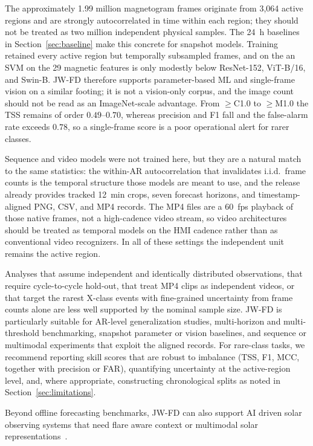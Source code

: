 \documentclass[universe,article,submit,moreauthors]{Definitions/mdpi}
\newif\ifrevision
\newcommand{\add}[1]{\ifrevision\textcolor{blue}{#1}\else#1\fi}
\newcommand{\del}[1]{\ifrevision\textcolor{red}{\sout{#1}}\else\fi}
\newcommand{\chg}[2]{\del{#1}\add{#2}}
\begin{document}
The approximately 1.99 million magnetogram frames originate from 3{,}064 active regions and are strongly autocorrelated in time within each region; they should not be treated as two million independent physical samples. The 24~h baselines in Section~\ref{sec:baseline} make this concrete for snapshot models. Training retained every active region but temporally subsampled frames, and on the \chg{seed-62 AR-level test set}{seed~3970 AR-level test set} an SVM on the 29 magnetic features is only modestly below ResNet-152, ViT-B/16, and Swin-B. JW-FD therefore supports parameter-based ML and single-frame vision on a similar footing; it is not a vision-only corpus, and the image count should not be read as an ImageNet-scale advantage. From $\geq$C1.0 to $\geq$M1.0 the TSS remains of order $0.49$--$0.70$, whereas precision and F1 fall and the false-alarm rate exceeds $0.78$, so a single-frame score is a poor operational alert for rarer classes.

Sequence and video models were not trained here, but they are a natural match to the same statistics: the within-AR autocorrelation that invalidates i.i.d.\ frame counts is the temporal structure those models are meant to use, and the release already provides tracked 12~min crops, seven forecast horizons, and timestamp-aligned PNG, CSV, and MP4 records. The MP4 files are a 60~fps playback of those native frames, not a high-cadence video stream, so video architectures should be treated as temporal models on the HMI cadence rather than as conventional video recognizers. In all of these settings the independent unit remains the active region.

Analyses that assume independent and identically distributed observations, that require cycle-to-cycle hold-out, that treat MP4 clips as independent videos, or that target the rarest X-class events with fine-grained uncertainty from frame counts alone are less well supported by the nominal sample size. JW-FD is particularly suitable for AR-level generalization studies, multi-horizon and multi-threshold benchmarking, snapshot parameter or vision baselines, and sequence or multimodal experiments that exploit the aligned records. For rare-class tasks, we recommend reporting skill scores that are robust to imbalance (TSS, F1, MCC, together with precision or FAR), quantifying uncertainty at the active-region level, and, where appropriate, constructing chronological splits as noted in Section~\ref{sec:limitations}.

Beyond offline forecasting benchmarks, JW-FD can also support AI driven solar observing systems that need flare aware context or multimodal solar representations~\cite{Lin2026sidest,Tong2026astclaw,Tong2026aims}.
\end{document}
